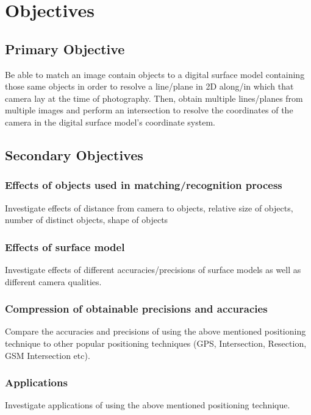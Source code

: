 

\section{Objectives}
\subsection{Primary Objective}
Be able to match an image contain objects to a digital surface model containing those same objects in 
order to resolve a line/plane in 2D along/in which that camera lay at the time of photography.
Then, obtain multiple lines/planes from multiple images and perform an intersection to resolve the 
coordinates of the camera in the digital surface model's coordinate system.

\subsection{Secondary Objectives}

\subsubsection{Effects of objects used in matching/recognition process}
Investigate effects of distance from camera to objects, relative size of objects, number of distinct 
objects, shape of objects

\subsubsection{Effects of surface model}
Investigate effects of different accuracies/precisions of surface models as well as different camera qualities.

\subsubsection{Compression of obtainable precisions and accuracies}
Compare the accuracies and precisions of using the above mentioned positioning technique to other popular 
positioning techniques (GPS, Intersection, Resection, GSM Intersection etc).

\subsubsection{Applications}
Investigate applications of using the above mentioned positioning technique.